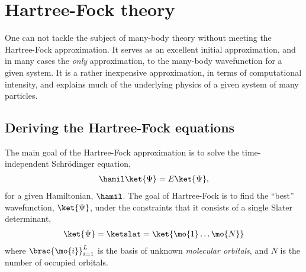 \chapter{Hartree-Fock theory}
    One can not tackle the subject of many-body theory without meeting the
    Hartree-Fock approximation. It serves as an excellent initial approximation,
    and in many cases the \emph{only} approximation, to the many-body
    wavefunction for a given system. It is a rather inexpensive approximation,
    in terms of computational intensity, and explains much of the underlying
    physics of a given system of many particles.

    \section{Deriving the Hartree-Fock equations}
        The main goal of the Hartree-Fock approximation is to solve the
        time-independent Schrödinger equation,
        \begin{align}
            \hamil\ket{\Psi} = E\ket{\Psi},
        \end{align}
        for a given Hamiltonian, $\hamil$. The goal of Hartree-Fock is to find
        the ``best'' wavefunction, $\ket{\Psi}$, under the constraints that it
        consists of a single Slater determinant,
        \begin{align}
            \ket{\Psi} = \ketslat
            = \ket{\mo{1}\dots\mo{N}}
        \end{align}
        where $\brac{\mo{i}}_{i = 1}^{L}$ is the basis of unknown
        \emph{molecular orbitals}, and $N$ is the number of occupied orbitals.
